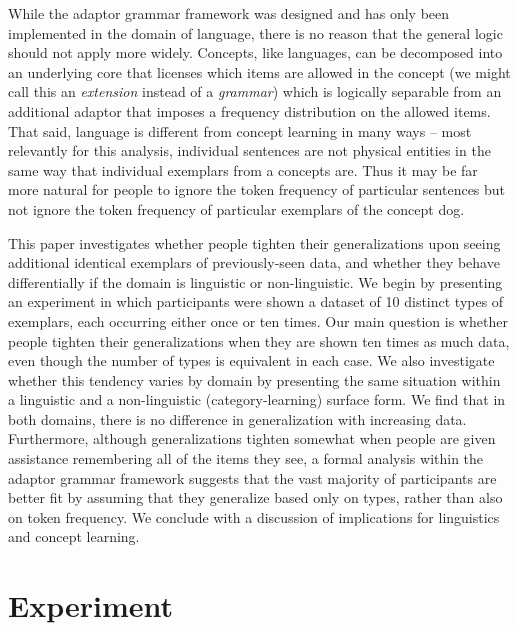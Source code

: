 \documentclass[10pt,letterpaper]{article}
\begin{document}
While the adaptor grammar framework was designed and has only been implemented in the domain of language, there is no reason that the general logic should not apply more widely. Concepts, like languages, can be decomposed into an underlying core that licenses which items are allowed in the concept (we might call this an {\it extension} instead of a {\it grammar}) which is logically separable from an additional adaptor that imposes a frequency distribution on the allowed items. That said, language is different from concept learning in many ways -- most relevantly for this analysis, individual sentences are not physical entities in the same way that individual exemplars from a concepts are. Thus it may be far more natural for people to ignore the token frequency of particular sentences but not ignore the token frequency of particular exemplars of the concept {\sc dog}. 

This paper investigates whether people tighten their generalizations upon seeing additional identical exemplars of previously-seen data, and whether they behave differentially if the domain is linguistic or non-linguistic. We begin by presenting an experiment in which participants were shown a dataset of 10 distinct types of exemplars, each occurring either once or ten times. Our main question is whether people tighten their generalizations when they are shown ten times as much data, even though the number of types is equivalent in each case. We also investigate whether this tendency varies by domain by presenting the same situation within a linguistic and a non-linguistic (category-learning) surface form. We find that in both domains, there is no difference in generalization with increasing data. Furthermore, although generalizations tighten somewhat when people are given assistance remembering all of the items they see, a formal analysis within the adaptor grammar framework suggests that the vast majority of participants are better fit by assuming that they generalize based only on types, rather than also on token frequency. We conclude with a discussion of implications for linguistics and concept learning.


\section*{Experiment}
\end{document}
